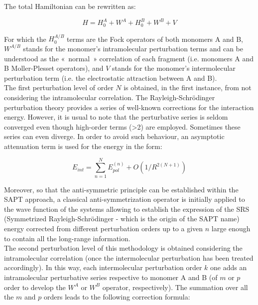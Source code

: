 		The total Hamiltonian can be rewritten as:
		
		\begin{equation}
		H = H_{0}^{A} + W^{A} + H_{0}^{B} + W^{B} + V
		\end{equation}
		
		For which the $H_{0}^{A/B}$ terms are the Fock operators of both monomers A and B, $W^{A/B}$ stands for the monomer's intramolecular perturbation terms and can be understood as the « normal » correlation of each fragment (i.e. monomers A and B Moller-Plesset operators), and $V$ stands for the monomer's intermolecular perturbation term (i.e. the electrostatic attraction between A and B).\\
		
		The first perturbation level of order $N$ is obtained, in the first instance, from not considering the intramolecular correlation. The Rayleigh-Schr\"{o}dinger perturbation theory provides a series of well-known corrections for the interaction energy.\cite{chipman1973perturbation} However, it is usual to note that the perturbative series is seldom converged even though high-order terms (>2) are employed. Sometimes these series can even diverge. In order to avoid such behaviour, an asymptotic attenuation term is used for the energy in the form:
		
		\begin{equation}
		E_{int} = \sum_{n=1}^{N} E_{pol}^{(n)} + O(1/R^{2 (N+1)})
		\end{equation}
		
		Moreover, so that the anti-symmetric principle can be established within the SAPT approach, a classical anti-symmetrization operator is initially applied to the wave function of the systems allowing to establish the expression of the SRS (Symmetrized Rayleigh-Schr\"{o}dinger - which is the origin of the SAPT name) energy corrected from different perturbation orders up to a given $n$ large enough to contain all the long-range information.\\
		
		The second perturbation level of this methodology is obtained considering the intramolecular correlation (once the intermolecular perturbation has been treated accordingly). In this way, each intermolecular perturbation order $k$ one adds an intramolecular perturbative series respective to monomer A and B (of $m$ or $p$ order to develop the $W^{A}$ or $W^{B}$ operator, respectively). The summation over all the $m$ and $p$ orders leads to the following correction formula:
		
